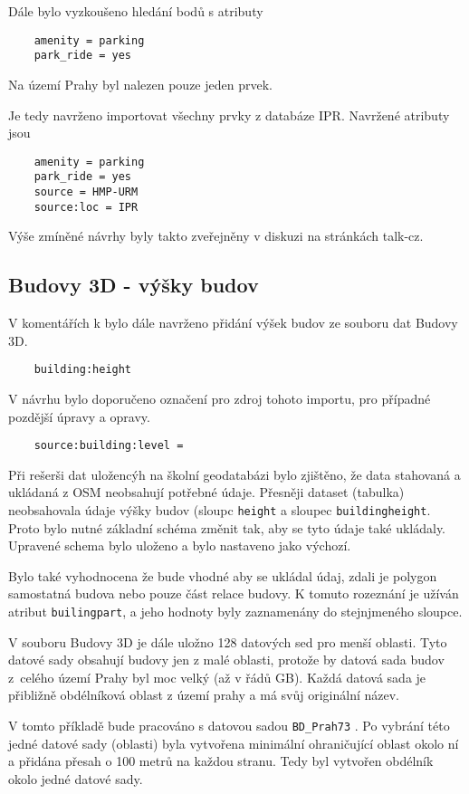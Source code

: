 Dále bylo vyzkoušeno hledání bodů s atributy 
\begin{verbatim}
    amenity = parking
    park_ride = yes
\end{verbatim}
Na území Prahy byl nalezen pouze jeden prvek.

Je tedy navrženo importovat všechny prvky z databáze IPR.
Navržené atributy jsou
\begin{verbatim}
    amenity = parking
    park_ride = yes
    source = HMP-URM
    source:loc = IPR
\end{verbatim}


Výše zmíněné návrhy byly takto zveřejněny v diskuzi na stránkách talk-cz.

\subsection{Budovy 3D - výšky budov}
\label{Budovy 3D - výšky budov}
V komentářích k bylo dále navrženo přidání výšek budov ze souboru dat Budovy 3D.
\begin{verbatim}
    building:height
\end{verbatim}
V návrhu bylo doporučeno označení pro zdroj tohoto importu, pro případné pozdější úpravy a opravy.
\begin{verbatim}
    source:building:level =
\end{verbatim}

Při rešerši dat uložencýh na školní geodatabázi bylo zjištěno,
že data stahovaná a ukládaná z OSM neobsahují potřebné údaje.
Přesněji dataset (tabulka) neobsahovala údaje výšky budov
(sloupc {\tt height} a sloupec {\tt building\:height}.
Proto bylo nutné základní schéma změnit tak, aby se tyto údaje také ukládaly.
Upravené schema bylo uloženo a bylo nastaveno jako výchozí.

Bylo také vyhodnocena že bude vhodné aby se ukládal údaj, zdali
je polygon samostatná budova nebo pouze část relace budovy.
K tomuto rozeznání je užíván atribut {\tt builing\:part},
a jeho hodnoty byly zaznamenány do stejnjmeného sloupce.


V souboru Budovy 3D je dále uložno 128 datových sed pro menší oblasti.
Tyto datové sady obsahují budovy jen z malé oblasti, protože by datová sada budov
z~celého území Prahy byl moc velký (až v řádů GB).
Každá datová sada je přibližně obdélníková oblast z území prahy
a má svůj originální název.

V tomto příkladě bude pracováno s datovou sadou {\tt BD\_Prah73} .
Po vybrání této jedné datové sady (oblasti) byla vytvořena minimální
ohraničující oblast okolo ní a přidána přesah o 100 metrů na každou stranu.
Tedy byl vytvořen obdélník okolo jedné datové sady.

